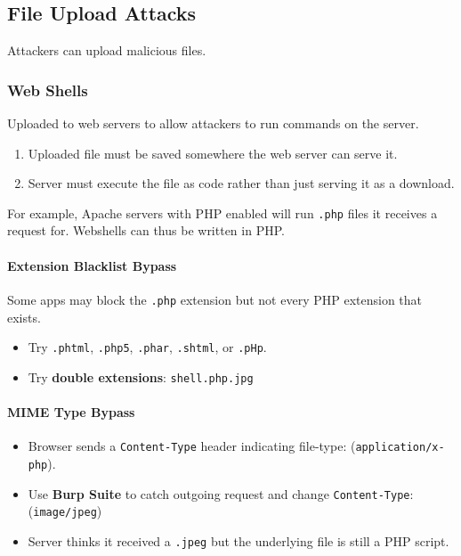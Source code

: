 \documentclass[12pt, letterpaper]{article}
\begin{document}
\subsection*{File Upload Attacks}

Attackers can upload malicious files.

\subsubsection*{Web Shells}

Uploaded to web servers to allow attackers to run commands on the server.

\begin{enumerate}
    \item Uploaded file must be saved somewhere the web server can serve it.
    \item Server must execute the file as code rather than just serving it as a download.
\end{enumerate}

For example, Apache servers with PHP enabled will run \texttt{.php} files it receives a request for. Webshells can thus be written in PHP.

\paragraph*{Extension Blacklist Bypass}

Some apps may block the \texttt{.php} extension but not every PHP extension that exists.

\begin{itemize}
    \item Try \texttt{.phtml}, \texttt{.php5}, \texttt{.phar}, \texttt{.shtml}, or \texttt{.pHp}.
    \item Try \textbf{double extensions}: \texttt{shell.php.jpg}
\end{itemize}

\paragraph*{MIME Type Bypass}

\begin{itemize}
    \item Browser sends a \texttt{Content-Type} header indicating file-type: (\texttt{application/x-php}).
    \item Use \textbf{Burp Suite} to catch outgoing request and change \texttt{Content-Type}: (\texttt{image/jpeg})
    \item Server thinks it received a \texttt{.jpeg} but the underlying file is still a PHP script.
\end{itemize}
\end{document}
